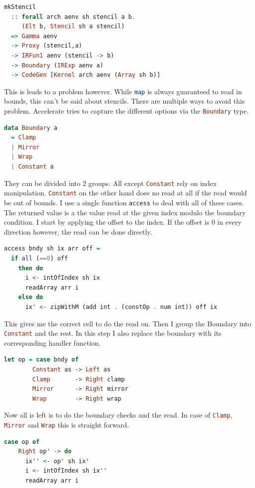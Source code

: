 \documentclass[a4paper,bibliography=totocnumbered,parskip,headsepline]{scrbook}
\begin{document}
\begin{lstlisting}[language=haskell]
mkStencil 
  :: forall arch aenv sh stencil a b.
     (Elt b, Stencil sh a stencil)
  => Gamma aenv
  -> Proxy (stencil,a)
  -> IRFun1 aenv (stencil -> b)
  -> Boundary (IRExp aenv a)
  -> CodeGen [Kernel arch aenv (Array sh b)]
\end{lstlisting}

This is leads to a problem however.
While \lstinline[language=haskell]!map! is always guaranteed to read in bounds, this can't be said about stencils.
There are multiple ways to avoid this problem.
Accelerate tries to capture the different options via the \lstinline[language=haskell]!Boundary! type.
\begin{lstlisting}[language=haskell]
data Boundary a
  = Clamp
  | Mirror
  | Wrap
  | Constant a
\end{lstlisting}
They can be divided into 2 groups.
All except \lstinline[language=haskell]!Constant! rely on index manipulation.
\lstinline[language=haskell]!Constant! on the other hand does no read at all if the read would be out of bounds.
I use a single function \lstinline[language=haskell]!access! to deal with all of these cases.
The returned value is a the value read at the given index modulo the boundary condition.
I start by applying the offset to the index.
If the offset is 0 in every direction however, the read can be done directly.
\begin{lstlisting}[language=haskell]
access bndy sh ix arr off =
  if all (==0) off
    then do
      i <- intOfIndex sh ix
      readArray arr i
    else do
      ix' <- zipWithM (add int . (constOp . num int)) off ix
\end{lstlisting}
This gives me the correct cell to do the read on.
Then I group the Boundary into \lstinline[language=haskell]!Constant! and the rest.
In this step I also replace the boundary with its corresponding handler function.
\begin{lstlisting}[language=haskell]
  let op = case bndy of
        Constant as -> Left as
        Clamp       -> Right clamp
        Mirror      -> Right mirror
        Wrap        -> Right wrap
\end{lstlisting}
Now all is left is to do the boundary checks and the read.
In case of \lstinline[language=haskell]!Clamp!, \lstinline[language=haskell]!Mirror! and \lstinline[language=haskell]!Wrap! this is straight forward.
\begin{lstlisting}[language=haskell]
  case op of
    Right op' -> do
      ix'' <- op' sh ix'
      i <- intOfIndex sh ix''
      readArray arr i
\end{lstlisting}
\end{document}
